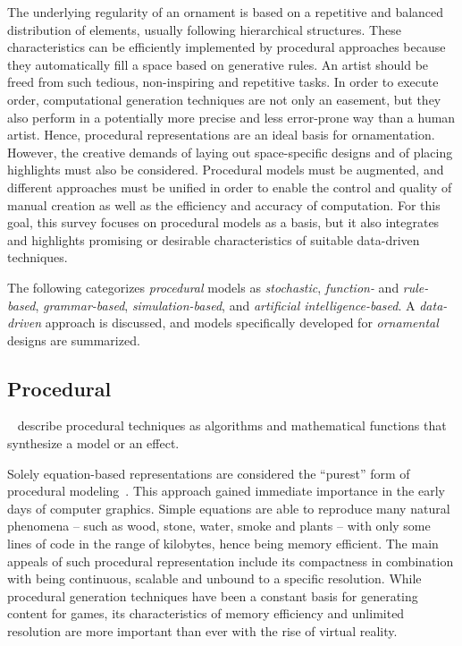 The underlying regularity of an ornament is based on a repetitive and balanced distribution of elements, usually following hierarchical structures. These characteristics can be efficiently implemented by procedural approaches \cite{stava_2010_ipm} because they automatically fill a space based on generative rules. An artist should be freed from such tedious, non-inspiring and repetitive tasks. In order to execute order, computational generation techniques are not only an easement, but they also perform in a potentially more precise and less error-prone way than a human artist. Hence, procedural representations are an ideal basis for ornamentation. However, the creative demands of laying out space-specific designs and of placing highlights must also be considered. Procedural models must be augmented, and different approaches must be unified in order to enable the control and quality of manual creation as well as the efficiency and accuracy of computation. For this goal, this survey focuses on procedural models as a basis, but it also integrates and highlights promising or desirable characteristics of suitable data-driven techniques.

The following categorizes \textit{procedural} models as \textit{stochastic}, \textit{function-} and \textit{rule-based}, \textit{grammar-based}, \textit{simulation-based}, and \textit{artificial intelligence-based}. A \textit{data-driven} approach is discussed, and models specifically developed for \textit{ornamental} designs are summarized.


\subsection{Procedural}
\label{subsec:models_procedural}
 \citeauthor*{ebert_2003_tmp}~\cite{ebert_2003_tmp} describe procedural techniques as algorithms and mathematical functions that synthesize a model or an effect.

Solely equation-based representations are considered the ``purest'' form of procedural modeling~\cite{smelik_2014_aso}. This approach gained immediate importance in the early days of computer graphics. Simple equations are able to reproduce many natural phenomena – such as wood, stone, water, smoke and plants – with only some lines of code in the range of kilobytes, hence being memory efficient. The main appeals of such procedural representation include its compactness in combination with being continuous, scalable and unbound to a specific resolution. While procedural generation techniques have been a constant basis for generating content for games, its characteristics of memory efficiency and unlimited resolution are more important than ever with the rise of virtual reality.


